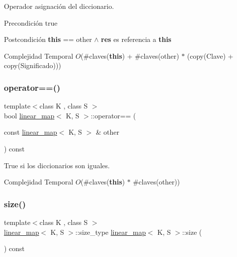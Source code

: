 Operador asignación del diccionario. 

\begin{DoxyPrecond}{Precondición}
true 
\end{DoxyPrecond}
\begin{DoxyPostcond}{Postcondición}
{\bfseries this} == other $\land$ {\bfseries res} es referencia a {\bfseries this}
\end{DoxyPostcond}

\begin{DoxyDescription}
\item[Complejidad Temporal]$O$(\#claves({\bfseries this}) + \#claves(other) $\ast$ (copy(\+Clave) + copy(\+Significado)))
\end{DoxyDescription}\mbox{\label{classlinear__map_a3429a0dcc296c4098aef699e089073a1}} 
\subsubsection{\texorpdfstring{operator==()}{operator==()}}
{\footnotesize\ttfamily template$<$class K , class S $>$ \\
bool \mbox{\hyperlink{classlinear__map}{linear\+\_\+map}}$<$ K, S $>$\+::operator== (\begin{DoxyParamCaption}\item[{const \mbox{\hyperlink{classlinear__map}{linear\+\_\+map}}$<$ K, S $>$ \&}]{other }\end{DoxyParamCaption}) const}



True si los diccionarios son iguales. 


\begin{DoxyDescription}
\item[Complejidad Temporal]$O$(\#claves({\bfseries this}) $\ast$ \#claves(other))
\end{DoxyDescription}\mbox{\label{classlinear__map_a3236ab6c5afff15a94cbc932cba6934b}} 
\subsubsection{\texorpdfstring{size()}{size()}}
{\footnotesize\ttfamily template$<$class K , class S $>$ \\
\mbox{\hyperlink{classlinear__map}{linear\+\_\+map}}$<$ K, S $>$\+::size\+\_\+type \mbox{\hyperlink{classlinear__map}{linear\+\_\+map}}$<$ K, S $>$\+::size (\begin{DoxyParamCaption}{ }\end{DoxyParamCaption}) const}



